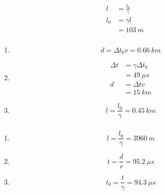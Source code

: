 \documentclass{article}
\begin{document}
\begin{align*}
  l   & = \frac{l_0}{\gamma} \\
  l_0 & = \gamma l           \\
      & = \qty{103}{m}
\end{align*}

\setcounter{subsubsection}{10}
\subsubsection{}

\begin{enumerate}
  \item \[d = \Delta t_0 v = \qty{0.66}{km}\]

  \item

        \begin{align*}
          \Delta t & = \gamma \Delta t_0 \\
                   & = \qty{49}{\mu s}   \\
          d        & = \Delta t v        \\
                   & = \qty{15}{km}
        \end{align*}

  \item \[l = \frac{l_0}{\gamma} = \qty{0.45}{km}\]
\end{enumerate}

\setcounter{subsubsection}{12}
\subsubsection{}

\begin{enumerate}
  \item \[l = \frac{l_0}{\gamma} = \qty{3960}{m}\]

  \item \[t = \frac{d}{v} = \qty{95.2}{\mu s}\]

  \item \[t_0 = \frac{t}{\gamma} = \qty{94.3}{\mu s}\]
\end{enumerate}

\setcounter{subsubsection}{14}
\subsubsection{}
\end{document}
